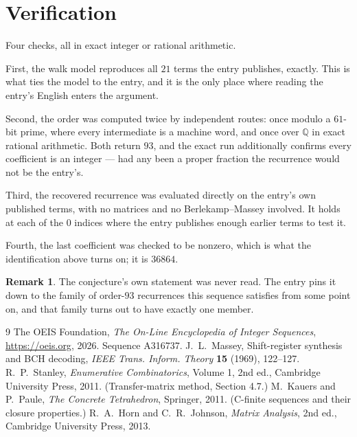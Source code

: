\documentclass[11pt,a4paper]{article}
\theoremstyle{plain}
\theoremstyle{definition}
\newtheorem{remark}[theorem]{Remark}
\begin{document}
\section{Verification}

Four checks, all in exact integer or rational arithmetic.

First, the walk model reproduces all $21$ terms the entry publishes, exactly. This is
what ties the model to the entry, and it is the only place where reading the entry's English
enters the argument.

Second, the order was computed twice by independent routes: once modulo a $61$-bit prime, where
every intermediate is a machine word, and once over $\mathbb{Q}$ in exact rational arithmetic.
Both return $93$, and the exact run additionally confirms every coefficient is an integer
--- had any been a proper fraction the recurrence would not be the entry's.

Third, the recovered recurrence was evaluated directly on the entry's own published terms, with
no matrices and no Berlekamp--Massey involved. It holds at each of the $0$ indices where
the entry publishes enough earlier terms to test it.

Fourth, the last coefficient was checked to be nonzero, which is what the identification above
turns on; it is $36864$.

\begin{remark}
The conjecture's own statement was never read. The entry pins it down to the family of
order-$93$ recurrences this sequence satisfies from some point on, and that family turns
out to have exactly one member.
\end{remark}

\begin{thebibliography}{9}
 The OEIS Foundation, \emph{The On-Line Encyclopedia of Integer
Sequences}, \url{https://oeis.org}, 2026. Sequence A316737.
 J.~L.~Massey, Shift-register synthesis and BCH decoding, \emph{IEEE
Trans. Inform. Theory} \textbf{15} (1969), 122--127.
 R.~P.~Stanley, \emph{Enumerative Combinatorics}, Volume 1, 2nd ed.,
Cambridge University Press, 2011. (Transfer-matrix method, Section 4.7.)
 M.~Kauers and P.~Paule, \emph{The Concrete Tetrahedron}, Springer, 2011.
(C-finite sequences and their closure properties.)
 R.~A.~Horn and C.~R.~Johnson, \emph{Matrix Analysis}, 2nd ed., Cambridge
University Press, 2013.
\end{thebibliography}
\end{document}
